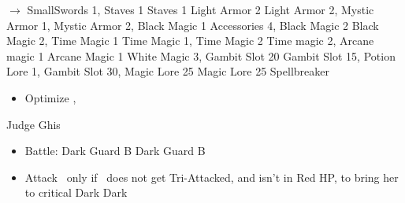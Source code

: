 \begin{liscense}
\begin{itemize}
	\baschf $\rightarrow$
	\ashef SmallSwords 1, Staves 1
	\penelof Staves 1
	\vaanf Light Armor 2
	\penelof Light Armor 2, Mystic Armor 1, Mystic Armor 2, Black Magic 1
	\ashef Accessories 4, Black Magic 2
	\penelof Black Magic 2, Time Magic 1
	\vaanf Time Magic 1, Time Magic 2
	\penelof Time magic 2, Arcane magic 1
	\vaanf Arcane Magic 1
	\ashef White Magic 3, Gambit Slot 20
	\penelof Gambit Slot 15, Potion Lore 1, Gambit Slot 30, Magic Lore 25
	\ashef Magic Lore 25
	\penelof Spellbreaker
\end{itemize}
\end{liscense}
\begin{equip}
	\begin{itemize}
		\item Optimize \ashe, \penelo
	\end{itemize}
\end{equip}
\begin{battle}{Judge Ghis}
	\begin{itemize}
		\penelof Dark \penelo
		\vaanf Reflect \ashe
		\ashef Heal \vaan
		\penelof Reflect \penelo
		\vaanf Reflect \vaan
		\item Battle:
		      \vaanf Dark Guard B
		      \penelof Dark Guard B
		      \item \leader{\penelo}
		      \ashef Attack \penelo\ only if \penelo\ does not get Tri-Attacked, and isn't in Red HP, to bring her to critical
		      \vaanf Dark \penelo
		      \penelof Dark \penelo
	\end{itemize}
\end{battle}